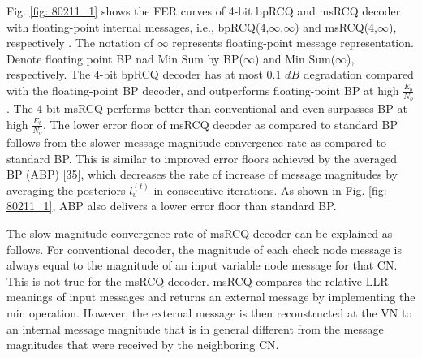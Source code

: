 \documentclass [PhD] {uclathes}
\begin{document}
Fig. \ref{fig: 80211_1} shows the FER curves of  4-bit bpRCQ and msRCQ decoder with floating-point internal messages, i.e., {bpRCQ}(4,$\infty$,$\infty$) and {msRCQ}(4,$\infty$), respectively . The notation of $\infty$ represents floating-point message representation. Denote floating point BP nad Min Sum by BP($\infty$) and Min Sum($
\infty$), respectively.  The 4-bit bpRCQ decoder has at most 0.1 $dB$ degradation compared with the floating-point BP decoder, and outperforms floating-point BP at high $\frac{E_b}{N_o}$.  The 4-bit msRCQ performs better than conventional \minsum and even surpasses BP at high $\frac{E_b}{N_o}$. The lower error floor of msRCQ decoder as compared to standard BP follows from the slower message magnitude convergence rate as compared to standard BP. This is similar to improved error floors achieved by the averaged BP (ABP) [35], which  decreases the rate of increase of message magnitudes by averaging the posteriors  $l_v^{(t)}$ in consecutive iterations. As shown in Fig. \ref{fig: 80211_1}, ABP also delivers a lower error floor than standard BP.

 The slow magnitude convergence rate of msRCQ decoder can be explained as follows.  For conventional \minsum decoder, the magnitude of each check node message is always equal to the magnitude of an input variable node message for that CN.  This is not true for the msRCQ decoder. msRCQ compares the relative LLR meanings of input messages and returns an external message by implementing the min operation. However, the external message is then reconstructed at the VN to an internal message magnitude that is in general different from the message magnitudes that were received by the neighboring CN. 
\end{document}
